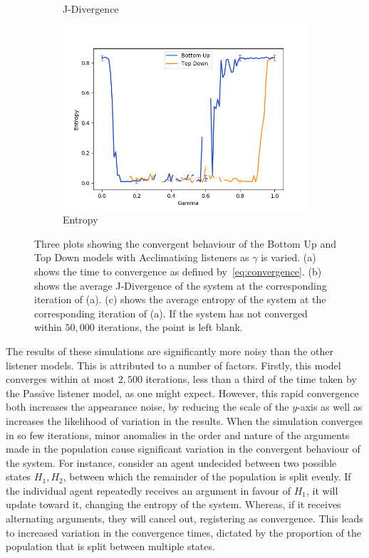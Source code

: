 \begin{figure}
\begin{subfigure}[ht]{0.45\textwidth}
    \caption{J-Divergence}
 \end{subfigure}
 \hfill
 \begin{subfigure}[ht]{0.45\textwidth}
    \includegraphics[width=\textwidth]{Images/Figures/ListenerModelPlots/Ageing/AgeingEntropyDONTDELETE(copy).png}
    \caption{Entropy}
 \end{subfigure}
 \caption{Three plots showing the convergent behaviour of the Bottom Up and Top Down models with Acclimatising listeners as $\gamma$ is varied. (a) shows the time to convergence as defined by~\cref{eq:convergence}. (b) shows the average J-Divergence of the system at the corresponding iteration of (a). (c) shows the average entropy of the system at the corresponding iteration of (a). If the system has not converged within $50,000$ iterations, the point is left blank.}\label{fig:convergence_Ageing}
\end{figure}


The results of these simulations are significantly more noisy than the other listener models. This is attributed to a number of factors. Firstly, this model converges within at most $2,500$ iterations, less than a third of the time taken by the Passive listener model, as one might expect. However, this rapid convergence both increases the appearance noise, by reducing the scale of the $y$-axis as well as increases the likelihood of variation in the results. When the simulation converges in so few iterations, minor anomalies in the order and nature of the arguments made in the population cause significant variation in the convergent behaviour of the system. For instance, consider an agent undecided between two possible states $H_1, H_2$, between which the remainder of the population is split evenly. If the individual agent repeatedly receives an argument in favour of $H_1$, it will update toward it, changing the entropy of the system. Whereas, if it receives alternating arguments, they will cancel out, registering as convergence. This leads to increased variation in the convergence times, dictated by the proportion of the population that is split between multiple states.

